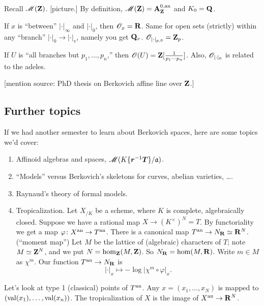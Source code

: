Recall $\operatorname{\mathscr{M}}(\mathbf{Z})$. [picture.] By definition, 
$\operatorname{\mathscr{M}}(\mathbf{Z})=\mathbf{A}_{\mathbf{Z}}^{0,\mathrm{an}}$ and $K_0=\mathbf{Q}$. 

If $x$ is ``between'' $|\cdot|_\infty$ and $|\cdot|_0$, then 
$\mathscr{O}_x = \mathbf{R}$. Same for open sets (strictly) within any ``branch'' 
$|\cdot|_0 \to |\cdot|_v$, namely you get $\mathbf{Q}_v$. 
$\mathscr{O}_{|\cdot|_{p,0}} = \mathbf{Z}_p$. 

If $U$ is ``all branches but $p_1,\dots,p_n$,'' then 
$\mathscr{O}(U)=\mathbf{Z}[\frac{1}{p_1\dotsm p_n}]$. Also, $\mathscr{O}_{|\cdot|_0}$ is related to the 
adeles. 

[mention source: PhD thesis on Berkovich affine line over $\mathbf{Z}$.]





\subsection{Further topics}

If we had another semester to learn about Berkovich spaces, here are some
topics we'd cover:
\begin{enumerate}
\item
Affinoid algebras and spaces, $\operatorname{\mathscr{M}}(K\{ \bm r^{-1} \bm T \}/\mathfrak{a})$. 

\item
``Models'' versus Berkovich's skeletons for curves, abelian varieties, \ldots. 

\item
Raynaud's theory of formal models. 

\item
Tropicalization. Let $X_{/K}$ be a scheme, where $K$ is complete, algebraically 
closed. Suppose we have a rational map $X\to (K^\times)^N=T$. By functoriality we 
get a map $\varphi\colon X^{\mathrm{an}} \to T^{\mathrm{an}}$. There is a canonical map 
$T^{\mathrm{an}}\to N_{\mathbf{R}}\simeq \mathbf{R}^N$. (``moment map'') Let $M$ be the lattice of 
(algebraic) characters of $T$; note $M\simeq \mathbf{Z}^N$, and we put 
$N=\hom_{\mathbf{Z}}(M,\mathbf{Z})$. So $N_{\mathbf{R}}=\hom(M,\mathbf{R})$. Write $m\in M$ as $\chi^m$. Our 
function $T^{\mathrm{an}}\to N_{\mathbf{R}}$ is 
\[
	|\cdot|_x\mapsto -\log |\chi^m\circ\varphi|_x .
\]
\end{enumerate}

Let's look at type 1 (classical) points of $T^{\mathrm{an}}$. Any $x=(x_1,\dots,x_N)$ is 
mapped to $(\operatorname{val}(x_1),\dots,\operatorname{val}(x_n))$. The tropicalization of 
$X$ is the image of $X^{\mathrm{an}}\to \mathbf{R}^N$. 
